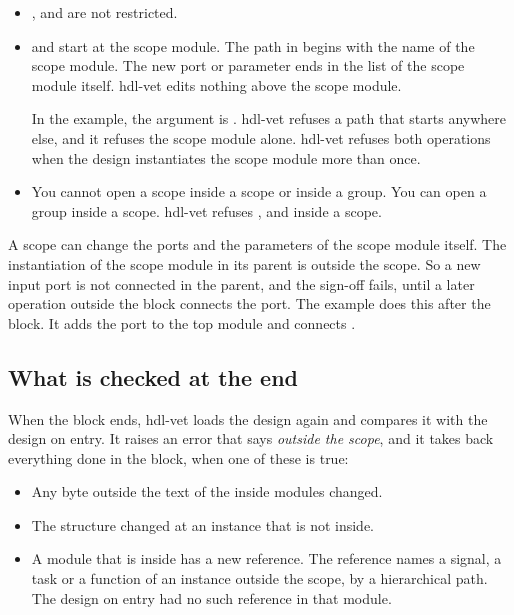 \begin{itemize}
\begin{itemize}
  \item {}
  \item {}
  \item {}
  \item {}
  \end{itemize}
  These directives reach text outside the module. hdl-vet allows a use of a macro and
  the directives , , ,  and
  .
\item {},  and  are not
  restricted.
\item {} and  start at the scope module.
  The path in  begins with the name of the scope module. The new port
  or parameter ends in the list of the scope module itself. hdl-vet edits nothing above
  the scope module.

  In the example, the argument is .
  hdl-vet refuses a path that starts anywhere else, and it refuses the scope module alone.
  hdl-vet refuses both operations when the design instantiates the scope module more
  than once.
\item You cannot open a scope inside a scope or inside a group. You can open a group
  inside a scope. hdl-vet refuses ,  and
   inside a scope.
\end{itemize}

A scope can change the ports and the parameters of the scope module itself. The
instantiation of the scope module in its parent is outside the scope. So a new input
port is not connected in the parent, and the sign-off fails, until a later operation
outside the block connects the port. The example does this after the block. It adds the
port to the top module and connects .

\subsection*{What is checked at the end}

When the block ends, hdl-vet loads the design again and compares it with the
design on entry. It raises an error that says \emph{outside the scope}, and it takes
back everything done in the block, when one of these is true:

\begin{itemize}
\item Any byte outside the text of the inside modules changed.
\item The structure changed at an instance that is not inside.
\item A module that is inside has a new reference. The reference names a signal, a
  task or a function of an instance outside the scope, by a hierarchical path. The
  design on entry had no such reference in that module.
\end{itemize}

